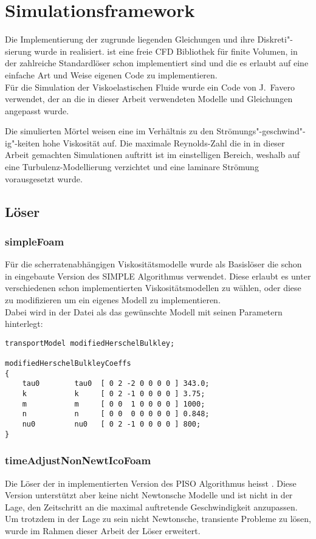 \section{Simulationsframework}
\label{Kapitel:Implementierung}
Die Implementierung der zugrunde liegenden Gleichungen und ihre Diskreti"-sierung wurde in \openfoam{} \cite{openfoam} realisiert.
\openfoam{} ist eine freie CFD Bibliothek für finite Volumen, in der zahlreiche Standardlöser schon implementiert sind und die es erlaubt auf eine einfache Art und Weise eigenen Code zu implementieren.\\
Für die Simulation der Viskoelastischen Fluide wurde ein Code von J.~Favero \cite{faveroOF} verwendet, der an die in dieser Arbeit verwendeten Modelle und Gleichungen angepasst wurde.

Die simulierten Mörtel weisen eine im Verhältnis zu den Strömungs"-geschwind"-ig"-keiten hohe Viskosität auf. 
Die maximale Reynolds-Zahl die in in dieser Arbeit gemachten Simulationen auftritt ist im einstelligen Bereich, weshalb auf eine Turbulenz-Modellierung verzichtet und eine laminare Strömung vorausgesetzt wurde.
%
\subsection{Löser}
\subsubsection{simpleFoam}
Für die scherratenabhängigen Viskositätsmodelle wurde als Basislöser die schon in \openfoam{} eingebaute Version  des SIMPLE Algorithmus verwendet.
Diese erlaubt es unter verschiedenen schon implementierten Viskositätsmodellen zu wählen, oder diese zu modifizieren um ein eigenes Modell zu implementieren.\\
Dabei wird in der Datei  als  das gewünschte Modell mit seinen Parametern hinterlegt:
%
\begin{lstlisting}
transportModel modifiedHerschelBulkley;

modifiedHerschelBulkleyCoeffs
{
    tau0        tau0  [ 0 2 -2 0 0 0 0 ] 343.0;
    k           k     [ 0 2 -1 0 0 0 0 ] 3.75;
    m           m     [ 0 0  1 0 0 0 0 ] 1000;
    n           n     [ 0 0  0 0 0 0 0 ] 0.848;
    nu0         nu0   [ 0 2 -1 0 0 0 0 ] 800;
}
\end{lstlisting}
%
\subsubsection{timeAdjustNonNewtIcoFoam}
Die Löser der in \openfoam{} implementierten Version des PISO Algorithmus heisst .
Diese Version unterstützt aber keine nicht Newtonsche Modelle und ist nicht in der Lage, den Zeitschritt an die maximal auftretende Geschwindigkeit anzupassen.\\
Um trotzdem in der Lage zu sein nicht Newtonsche, transiente Probleme zu lösen, wurde im Rahmen dieser Arbeit der Löser  erweitert.


